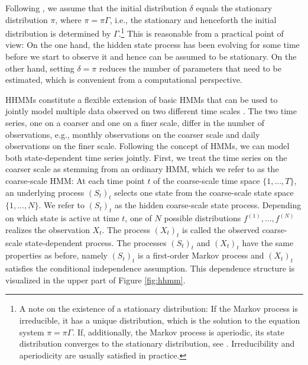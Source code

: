 \documentclass[article,shortnames]{jss}
\begin{document}
Following \cite{zuc16}, we assume that the initial distribution $\delta$ equals the stationary distribution $\pi$, where $\pi = \pi \Gamma$, i.e., the stationary and henceforth the initial distribution is determined by $\Gamma$.\footnote{A note on the existence of a stationary distribution: If the Markov process is irreducible, it has a unique distribution, which is the solution to the equation system $\pi = \pi \Gamma$. If, additionally, the Markov process is aperiodic, its state distribution converges to the stationary distribution, see \cite{nor97}. Irreducibility and aperiodicity are usually satisfied in practice.} This is reasonable from a practical point of view: On the one hand, the hidden state process has been evolving for some time before we start to observe it and hence can be assumed to be stationary. On the other hand, setting $\delta=\pi$ reduces the number of parameters that need to be estimated, which is convenient from a computational perspective.

HHMMs constitute a flexible extension of basic HMMs that can be used to jointly model multiple data observed on two different time scales \citep{oel21}. The two time series, one on a coarser and one on a finer scale, differ in the number of observations, e.g., monthly observations on the coarser scale and daily observations on the finer scale. Following the concept of HMMs, we can model both state-dependent time series jointly. First, we treat the time series on the coarser scale as stemming from an ordinary HMM, which we refer to as the coarse-scale HMM: At each time point $t$ of the coarse-scale time space $\{1,\dots,T\}$, an underlying process $(S_t)_t$ selects one state from the coarse-scale state space $\{1,\dots,N\}$. We refer to $(S_t)_t$ as the hidden coarse-scale state process. Depending on which state is active at time $t$, one of $N$ possible distributions $f^{(1)},\dots,f^{(N)}$ realizes the observation $X_t$. The process $(X_t)_t$ is called the observed coarse-scale state-dependent process. The processes $(S_t)_t$ and $(X_t)_t$ have the same properties as before, namely $(S_t)_t$ is a first-order Markov process and $(X_t)_t$ satisfies the conditional independence assumption. This dependence structure is visualized in the upper part of Figure \ref{fig:hhmm}.
\end{document}
